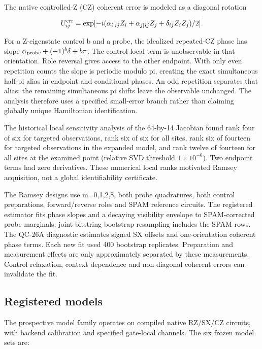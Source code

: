\documentclass[11pt,a4paper]{article}
\begin{document}
The native controlled-Z (CZ) coherent error is modeled as a diagonal rotation

\[
U_{ij}^{\rm err}=\exp[-i(\alpha_{i|ij}Z_i+\alpha_{j|ij}Z_j+\delta_{ij}Z_iZ_j)/2].
\]

For a Z-eigenstate control b and a probe, the idealized repeated-CZ phase has slope $\alpha_{\rm probe}+(-1)^b\delta+b\pi$. The control-local term is unobservable in that orientation. Role reversal gives access to the other endpoint. With only even repetition counts the slope is periodic modulo pi, creating the exact simultaneous half-pi alias in endpoint and conditional phases. An odd repetition separates that alias; the remaining simultaneous pi shifts leave the observable unchanged. The analysis therefore uses a specified small-error branch rather than claiming globally unique Hamiltonian identification.

The historical local sensitivity analysis of the 64-by-14 Jacobian found rank four of six for targeted observations, rank six of six for all sites, rank six of fourteen for targeted observations in the expanded model, and rank twelve of fourteen for all sites at the examined point (relative SVD threshold $1\times10^{-6}$). Two endpoint terms had zero derivatives. These numerical local ranks motivated Ramsey acquisition, not a global identifiability certificate.

The Ramsey designs use m=0,1,2,8, both probe quadratures, both control preparations, forward/reverse roles and SPAM reference circuits. The registered estimator fits phase slopes and a decaying visibility envelope to SPAM-corrected probe marginals; joint-bitstring bootstrap resampling includes the SPAM rows. The QC-26A diagnostic estimates signed SX offsets and one-orientation coherent phase terms. Each new fit used 400 bootstrap replicates. Preparation and measurement effects are only approximately separated by these measurements. Control relaxation, context dependence and non-diagonal coherent errors can invalidate the fit.

\subsection{Registered models}

The prospective model family operates on compiled native RZ/SX/CZ circuits, with backend calibration and specified gate-local channels. The six frozen model sets are:
\end{document}
